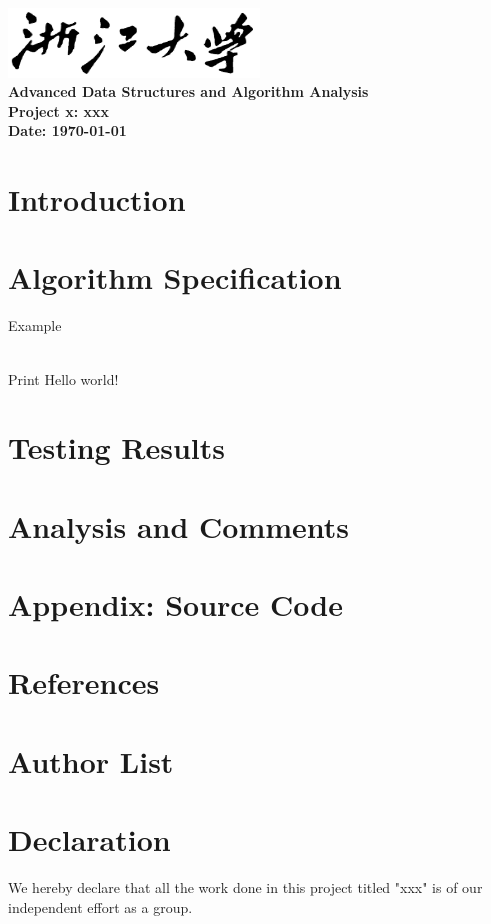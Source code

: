 \documentclass[a4paper,12pt]{article}
\newcommand{\makecustomtitle}{
	\begin{titlepage}
		\centering
		\includegraphics[width=0.5\textwidth]{./image.png}\\[2cm]
		{\fontsize{36}{10}\bfseries Advanced Data Structures and Algorithm Analysis}\\[2cm]
		{\Huge\bfseries\linespread{1.5} Project x: xxx}\\[2cm]
		{\large\bfseries\linespread{1.5}\selectfont Date: \today}\\[2cm]
	\end{titlepage}
}
\begin{document}
	
	\makecustomtitle
	
	\tableofcontents
	\newpage
	
	\section{Introduction}
	
	\newpage
	\section{Algorithm Specification}
	
	\begin{algorithm}[H]
		\caption{Example}
		\begin{algorithmic}[1]
			\\
			Print Hello world!
			\EndFunction
		\end{algorithmic}
	\end{algorithm}
	
	
	\newpage
	\section{Testing Results}
	
	\newpage
	\section{Analysis and Comments}
	
	\newpage
	\appendix
	\section*{Appendix: Source Code}
	
	\section*{References}
	
	\section*{Author List}
	
	\section*{Declaration}
	We hereby declare that all the work done in this project titled "xxx" is of our independent effort as a group.
	
\end{document}
